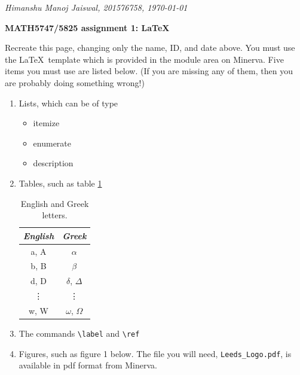 \documentclass[10pt, a4paper]{article}
\begin{document}
\thispagestyle{empty} 
\begin{flushright}
{\em Himanshu Manoj Jaiswal, 201576758, \today}
\end{flushright}

\begin{center}
{\Large \bf MATH5747/5825 assignment 1: \LaTeX}
    
\end{center}

{\indent Recreate this page, changing only the name, ID, and date above. You must use the \LaTeX \ template which is provided in the module area on Minerva. Five items you must use are listed below. (If you are missing any of them, then you are probably doing something wrong!)}



\begin{enumerate}
    \item Lists, which can be of type
   
    \begin{itemize}
   \item 
  itemize
   \item
    enumerate
   \item
   description
    
\end{itemize}

    \item Tables, such as table \ref{tab:Table1}
\begin{table}[h!]
    \begin{center}
        \begin{tabular}{c|c}
        {\em English} & {\em Greek}\\
        \hline
        a, A & $\alpha$\\
        b, B & $\beta$\\
        d, D & $\delta$, $\Delta$\\
        \vdots & \vdots\\
        w, W & $\omega$, $\Omega$\\
        \end{tabular}
    \end{center}
    \caption{English and Greek letters.}
    \label{tab:Table1}
\end{table}
    \item The commands \verb+\label+ and \verb+\ref+
    \item Figures, such as figure 1 below. The file you will need, \verb+Leeds_Logo.pdf+, is available in pdf format  from Minerva.


\end{enumerate}
\end{document}

